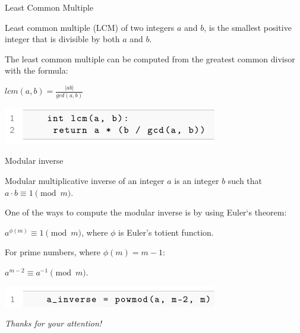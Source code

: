 \documentclass{beamer}
\begin{document}
    \begin{frame}{Least Common Multiple}
    
        Least common multiple (LCM) of two integers $a$ and $b$, is the smallest positive integer that is divisible by both $a$ and $b$.

    The least common multiple can be computed from the greatest common divisor with the formula:

    $lcm(a, b) = \frac{|ab|}{gcd(a,b)}$


    \includegraphics[width=0.7\textwidth]{images/lecture_2/lcm.png}

    \end{frame}

    \begin{frame}{Modular inverse}
    
    Modular multiplicative inverse of an integer $a$ is an integer $b$ such that $a \cdot b \equiv 1 \pmod{m}$. 
    
    \vspace{15px}

    One of the ways to compute the modular inverse is by using Euler`s theorem:
    
    $a^{\phi(m)} \equiv 1 \pmod{m}$, where $\phi$ is Euler's totient function. 
    
    \vspace{15px}

    For prime numbers, where $\phi(m) = m-1$:
    
    $a^{m-2} \equiv a^{-1} \pmod{m}$.


    \includegraphics[width=0.7\textwidth]{images/lecture_2/inverse.png}

    \end{frame}

    \begin{frame}{}
        \centering \Large
        \emph{Thanks for your attention!}
      \end{frame}
\end{document}
